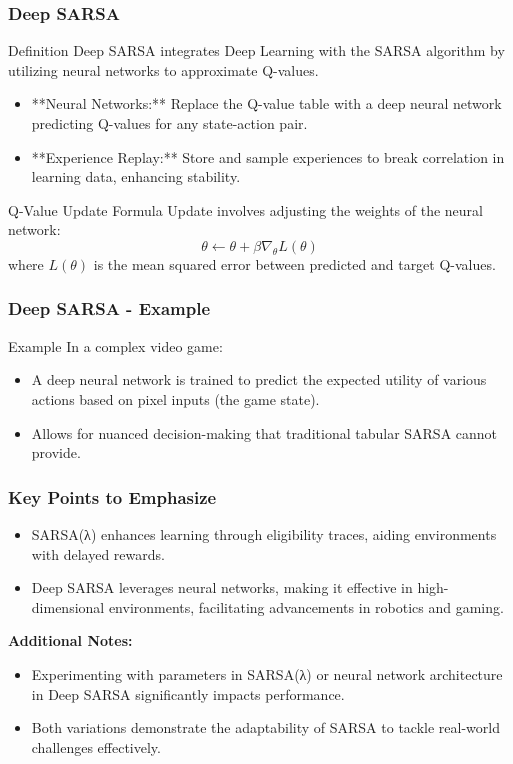 \documentclass{beamer}
\begin{document}
\begin{frame}[fragile]
    \frametitle{Deep SARSA}
    \begin{block}{Definition}
        Deep SARSA integrates Deep Learning with the SARSA algorithm by utilizing neural networks to approximate Q-values.
    \end{block}

    \begin{itemize}
        \item **Neural Networks:** Replace the Q-value table with a deep neural network predicting Q-values for any state-action pair.
        \item **Experience Replay:** Store and sample experiences to break correlation in learning data, enhancing stability.
    \end{itemize}
    
    \begin{block}{Q-Value Update Formula}
        Update involves adjusting the weights of the neural network:
        \[
        \theta \leftarrow \theta + \beta \nabla_{\theta} L(\theta)
        \]
        where \( L(\theta) \) is the mean squared error between predicted and target Q-values.
    \end{block}
\end{frame}

\begin{frame}[fragile]
    \frametitle{Deep SARSA - Example}
    \begin{block}{Example}
        In a complex video game:
        \begin{itemize}
            \item A deep neural network is trained to predict the expected utility of various actions based on pixel inputs (the game state).
            \item Allows for nuanced decision-making that traditional tabular SARSA cannot provide.
        \end{itemize}
    \end{block}
\end{frame}

\begin{frame}[fragile]
    \frametitle{Key Points to Emphasize}
    \begin{itemize}
        \item SARSA(λ) enhances learning through eligibility traces, aiding environments with delayed rewards.
        \item Deep SARSA leverages neural networks, making it effective in high-dimensional environments, facilitating advancements in robotics and gaming.
    \end{itemize}
    
    \textbf{Additional Notes:}
    \begin{itemize}
        \item Experimenting with parameters in SARSA(λ) or neural network architecture in Deep SARSA significantly impacts performance.
        \item Both variations demonstrate the adaptability of SARSA to tackle real-world challenges effectively.
    \end{itemize}
\end{frame}
\end{document}
